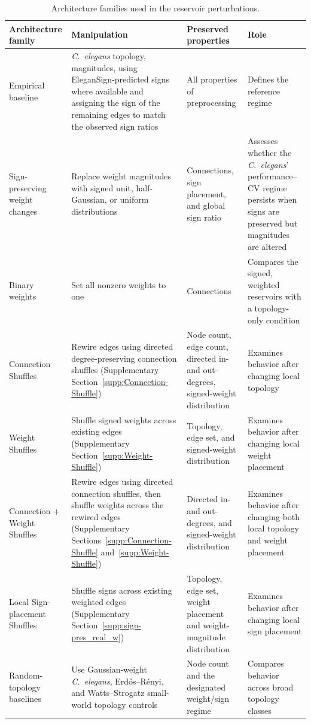 \documentclass[a4paper,fleqn]{style_neural_networks/cas-dc}
\let\parencite\citep
\begin{document}
\begin{table}[!t]
\centering
\small
\caption{Architecture families used in the reservoir perturbations.}
\label{tab:architecture_groups}
    \renewcommand{\arraystretch}{1.15}
    \setlength{\tabcolsep}{4pt}
\begin{tabular}{p{}p{}p{}p{}}
\toprule
Architecture family & Manipulation & Preserved properties & Role \\
\midrule
Empirical baseline & \textit{C.\ elegans} topology, magnitudes, using EleganSign-predicted signs where available and assigning the sign of the remaining edges to match the observed sign ratios & All properties of preprocessing & Defines the reference regime \\
Sign-preserving weight changes & Replace weight magnitudes with signed unit, half-Gaussian, or uniform distributions & Connections, sign placement, and global sign ratio & Assesses whether the \textit{C.\ elegans}' performance--CV regime persists when signs are preserved but magnitudes are altered \\
Binary weights & Set all nonzero weights to one & Connections & Compares the signed, weighted reservoirs with a topology-only condition  \\
Connection Shuffles & Rewire edges using directed degree-preserving connection shuffles (Supplementary Section~\ref{supp:Connection-Shuffle}) & Node count, edge count, directed in- and out-degrees, signed-weight distribution & Examines behavior after changing local topology \\
Weight Shuffles & Shuffle signed weights across existing edges (Supplementary Section~\ref{supp:Weight-Shuffle}) & Topology, edge set, and signed-weight distribution & Examines behavior after changing local weight placement \\
Connection + Weight Shuffles & Rewire edges using directed connection shuffles, then shuffle weights across the rewired edges (Supplementary Sections~\ref{supp:Connection-Shuffle} and~\ref{supp:Weight-Shuffle}) & Directed in- and out-degrees, and signed-weight distribution & Examines behavior after changing both local topology and weight placement \\
Local Sign-placement Shuffles & Shuffle signs across existing weighted edges (Supplementary Section~\ref{supp:sign-pres_real_w}) & Topology, edge set, weight placement and weight-magnitude distribution & Examines behavior after changing local sign placement \\

Random-topology baselines & Use Gaussian-weight \textit{C.\ elegans}, Erd\H{o}s--R\'enyi, and Watts--Strogatz small-world topology controls \parencite{network_science,KAWAI201915,Wssmallworld} & Node count and the designated weight/sign regime & Compares behavior across broad topology classes \\
\bottomrule
\end{tabular}
\end{table}
\end{document}
